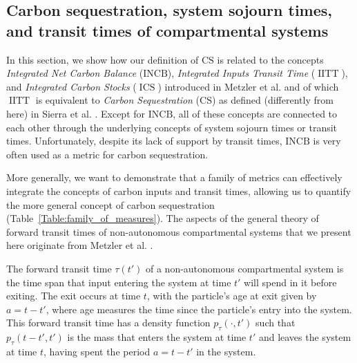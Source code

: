 \documentclass[9pt,twoside,lineno]{pnas-new_SI}
\newcommand{\CS}{\mathrm{CS}}
\newcommand{\INCB}{\mathrm{INCB}}
\newcommand{\IITT}{\operatorname{IITT}}
\newcommand{\ICS}{\operatorname{ICS}}
\begin{document}
\subsection*{Carbon sequestration, system sojourn times, and transit times of compartmental systems}
In this section, we show how our definition of $\CS$ is related to the concepts 
\emph{Integrated Net Carbon Balance} ($\INCB$), \emph{Integrated Inputs Transit Time} ($\IITT$), and \emph{Integrated Carbon Stocks} ($\ICS$) introduced in Metzler et al. \cite{Metzler2024} and of which $\IITT$ is equivalent to \emph{Carbon Sequestration} ($\CS$) as defined (differently from here) in Sierra et al. \cite{Sierra2021}.
Except for $\INCB$, all of these concepts are connected to each other through the underlying concepts of system sojourn times or transit times.
Unfortunately, despite its lack of support by transit times, $\INCB$ is very often used as a metric for carbon sequestration.

More generally, we want to demonstrate that a family of metrics can effectively integrate the concepts of carbon inputs and transit times, allowing us to quantify the more general concept of carbon sequestration (Table~\ref{Table:family_of_measures}).
The aspects of the general theory of forward transit times of non-autonomous compartmental systems that we present here originate from Metzler et al. \cite{Metzler2018PNAS}.

The forward transit time $\tau(t')$ of a non-autonomous compartmental system is the time span that input entering the system at time $t'$ will spend in it before exiting.
The exit occurs at time $t$, with the particle's age at exit given by $a=t-t'$, where age measures the time since the particle's entry into the system.
This forward transit time has a density function $p_\tau(\cdot,t')$ such that $p_\tau(t-t',t')$ is the mass that enters the system at time $t'$ and leaves the system at time $t$, having spent the period $a=t-t'$ in the system.
\end{document}

